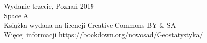 \thispagestyle{empty}
% 

\let\maketitle\oldmaketitle
\maketitle

\thispagestyle{empty}
\vspace*{\fill}
Wydanie trzecie, Poznań 2019 \\
Space A \\
Książka wydana na licencji Creative Commons BY \& SA \\
Więcej informacji \url{https://bookdown.org/nowosad/Geostatystyka/} \\
\\
\\


